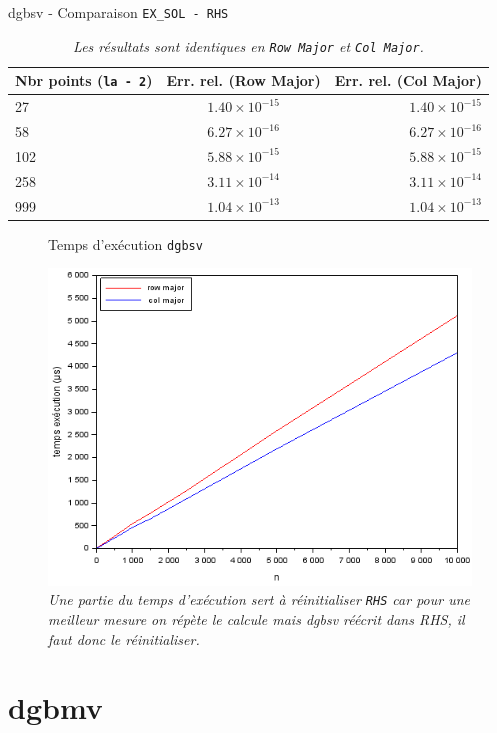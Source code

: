 \documentclass{article}
\begin{document}
\begin{table}[H]
\caption{dgbsv - Comparaison \texttt{EX\_SOL - RHS}}
\centering
\renewcommand*\arraystretch{1.1}
\begin{tabular}{|l|c|r|}
  \hline
  Nbr points (\texttt{la - 2}) & Err. rel. (Row Major) & Err. rel. (Col Major) \\
  \hline
	27	&	\(1.40 \times 10^{-15}\)	&	\(1.40 \times 10^{-15}\)	\\
	58	&	\(6.27 \times 10^{-16}\)	&	\(6.27 \times 10^{-16}\)	\\
	102	&	\(5.88 \times 10^{-15}\)	&	\(5.88 \times 10^{-15}\)	\\
	258	&	\(3.11 \times 10^{-14}\)	&	\(3.11 \times 10^{-14}\)	\\
	999	&	\(1.04 \times 10^{-13}\)	&	\(1.04 \times 10^{-13}\)	\\
  \hline
\end{tabular}
\caption*{\textit{Les résultats sont identiques en \texttt{Row Major} et \texttt{Col Major}.}}
\end{table}
\begin{figure}[H]
\caption{Temps d'exécution \texttt{dgbsv}}
\centering
\includegraphics[scale=0.70]{time_dgbsv}
\caption*{\textit{Une partie du temps d'exécution sert à réinitialiser \texttt{RHS} car pour une meilleur mesure on répète le calcule mais dgbsv réécrit dans RHS, il faut donc le réinitialiser.}}
\end{figure}

\section{dgbmv}
\end{document}
